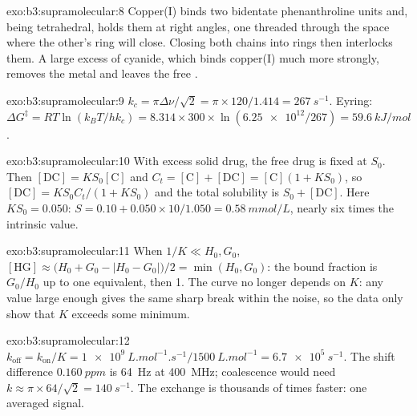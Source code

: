 \begin{solution}{exo:b3:supramolecular:8}
Copper(I) binds two bidentate phenanthroline units and, being tetrahedral, holds
them at right angles, one threaded through the space where the other's ring will
close. Closing both chains into rings then interlocks them. A large excess of
cyanide, which binds copper(I) much more strongly, removes the metal and leaves
the free .
\end{solution}

\begin{solution}{exo:b3:supramolecular:9}
$k_c = \pi\Delta\nu/\sqrt2 = \pi \times 120/1.414 = \qty{267}{s^{-1}}$. Eyring:
$\Delta G^\ddagger = RT\ln(k_BT/hk_c) = 8.314 \times 300 \times \ln(\num{6.25e12}/267) = \qty{59.6}{kJ/mol}$.
\end{solution}

\begin{solution}{exo:b3:supramolecular:10}
With excess solid drug, the free drug is fixed at $S_0$. Then $[\mathrm{DC}] = KS_0[\mathrm C]$ and
$C_t = [\mathrm C] + [\mathrm{DC}] = [\mathrm C](1 + KS_0)$, so $[\mathrm{DC}] = KS_0C_t/(1 + KS_0)$ and the total solubility is $S_0 + [\mathrm{DC}]$. Here
$KS_0 = 0.050$: $S = 0.10 + 0.050 \times 10/1.050 = \qty{0.58}{mmol/L}$, nearly six times the intrinsic value.
\end{solution}

\begin{solution}{exo:b3:supramolecular:11}
When $1/K \ll H_0, G_0$, $[\mathrm{HG}] \approx \bigl(H_0 + G_0 - |H_0 - G_0|\bigr)/2 = \min(H_0, G_0)$: the bound fraction is $G_0/H_0$ up to one
equivalent, then 1. The curve no longer depends on $K$: any value large enough
gives the same sharp break within the noise, so the data only show that $K$ exceeds
some minimum.
\end{solution}

\begin{solution}{exo:b3:supramolecular:12}
$k_{\mathrm{off}} = k_{\mathrm{on}}/K = \qty{1e9}{L.mol^{-1}.s^{-1}}/\qty{1500}{L.mol^{-1}} = \qty{6.7e5}{s^{-1}}$. The shift difference
$\qty{0.160}{ppm}$ is \qty{64}{Hz} at \qty{400}{MHz}; coalescence would need $k \approx \pi \times 64/\sqrt2 = \qty{140}{s^{-1}}$. The exchange is
thousands of times faster: one averaged signal.
\end{solution}

